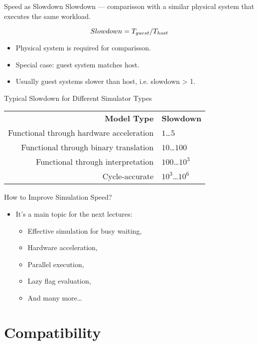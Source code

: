 \begin{frame}{Speed as Slowdown}
Slowdown --- comparisson with a similar physical system that executes the same
workload.

\begin{equation*}
\centering
Slowdown = T_{guest}/T_{host}
\end{equation*}

\vfill

\begin{itemize}
\item Physical system is required for comparisson.
\item Special case: guest system matches host.
\item Usually guest systems slower than host, i.e. slowdown > 1.
\end{itemize}
\end{frame}

\begin{frame}{Typical Slowdown for Different Simulator Types}
\begin{tabular}{rl}
\textbf{Model Type}                      & \textbf{Slowdown} \\
Functional through hardware acceleration & $1$\dots$5$ \\
Functional through binary translation    & $10$\dots$100$ \\
Functional through interpretation        & $100$\dots$10^3$ \\
Cycle-accurate                           & $10^3$\dots$10^6$ \\
\end{tabular}
\end{frame}

\begin{frame}{How to Improve Simulation Speed?}
\begin{itemize}
\item It's a main topic for the next lectures:
\begin{itemize}
\item Effective simulation for busy waiting,
\item Hardware acceleration,
\item Parallel execution,
\item Lazy flag evaluation,
\item And many more\dots
\end{itemize}
\end{itemize}
\end{frame}

\section{Compatibility}

